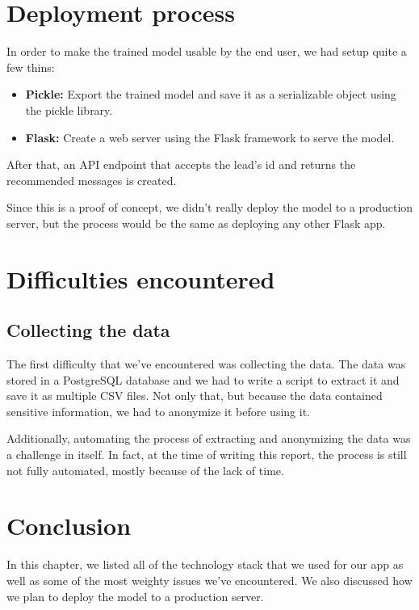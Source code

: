 \section{Deployment process}
In order to make the trained model usable by the end user, we had setup quite a few thins:

\begin{itemize}
    \item \textbf{Pickle:} Export the trained model and save it as a serializable object using the pickle library.
    \item \textbf{Flask:} Create a web server using the Flask framework to serve the model.
\end{itemize}

After that, an API endpoint that accepts the lead's id and returns the recommended messages is created.

Since this is a proof of concept, we didn't really deploy the model to a production server, but the process would be the same as deploying any other Flask app.

\section{Difficulties encountered}

\subsection{Collecting the data}
The first difficulty that we've encountered was collecting the data.
The data was stored in a PostgreSQL database and we had to write a script to extract it and save it as multiple CSV files.
Not only that, but because the data contained sensitive information, we had to anonymize it before using it.

Additionally, automating the process of extracting and anonymizing the data was a challenge in itself.
In fact, at the time of writing this report, the process is still not fully automated, mostly because of the lack of time.

\setcounter{secnumdepth}{0} %
\section{Conclusion}
In this chapter, we listed all of the technology stack that we used for our app as well as some of the most weighty issues we've encountered.
We also discussed how we plan to deploy the model to a production server.
